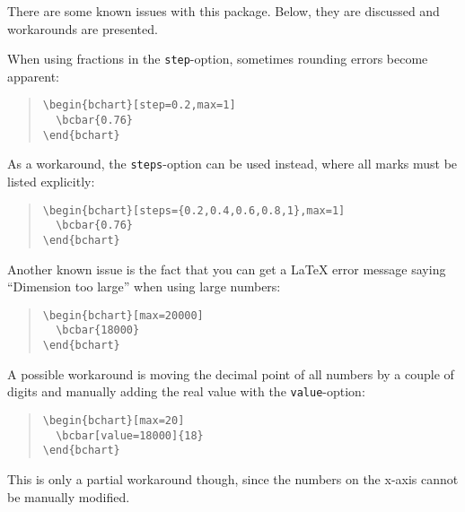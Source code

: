 \documentclass{article}
\begin{document}
There are some known issues with this package. Below, they are discussed and workarounds are presented.

When using fractions in the \texttt{step}-option, sometimes rounding errors become apparent:
\begin{quote}\small
\begin{verbatim}
\begin{bchart}[step=0.2,max=1]
  \bcbar{0.76}
\end{bchart}
\end{verbatim}
\end{quote}
\begin{quote}
\begin{bchart}[step=0.2,max=1]
\end{bchart}
\end{quote}
As a workaround, the \texttt{steps}-option can be used instead, where all marks must be listed explicitly:
\begin{quote}\small
\begin{verbatim}
\begin{bchart}[steps={0.2,0.4,0.6,0.8,1},max=1]
  \bcbar{0.76}
\end{bchart}
\end{verbatim}
\end{quote}
\begin{quote}
\begin{bchart}[steps={0.2,0.4,0.6,0.8,1},max=1]
\end{bchart}
\end{quote}

Another known issue is the fact that you can get a \LaTeX{} error message saying ``Dimension too large'' when using large numbers:
\begin{quote}\small
\begin{verbatim}
\begin{bchart}[max=20000]
  \bcbar{18000}
\end{bchart}
\end{verbatim}
\end{quote}
A possible workaround is moving the decimal point of all numbers by a couple of digits and manually adding the real value with the \texttt{value}-option:
\begin{quote}\small
\begin{verbatim}
\begin{bchart}[max=20]
  \bcbar[value=18000]{18}
\end{bchart}
\end{verbatim}
\end{quote}
\begin{quote}
\begin{bchart}[max=20]
\end{bchart}
\end{quote}
This is only a partial workaround though, since the numbers on the x-axis cannot be manually modified.
\end{document}
